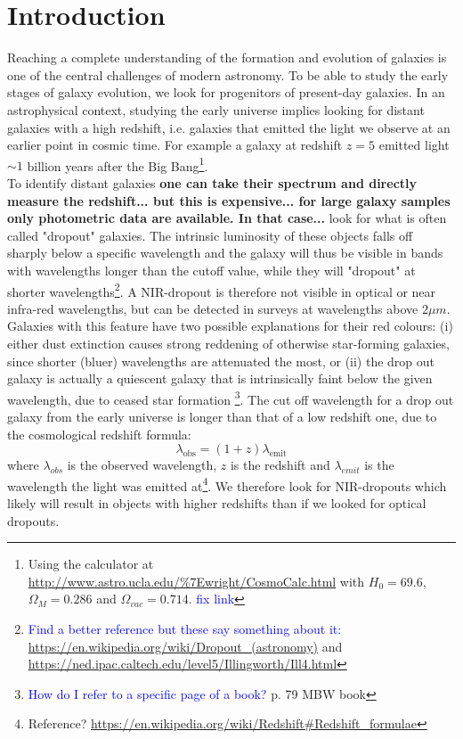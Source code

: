 \section{Introduction}
Reaching a complete understanding of the formation and evolution of galaxies is one of the central challenges of modern astronomy. To be able to study the early stages of galaxy evolution, we look for progenitors of present-day galaxies. In an astrophysical context, studying the early universe implies looking for distant galaxies with a high redshift, i.e. galaxies that emitted the light we observe at an earlier point in cosmic time. For example a galaxy at redshift $z=5$ emitted light $\sim1$ billion years after the Big Bang\footnote{Using the calculator at \url{http://www.astro.ucla.edu/\%7Ewright/CosmoCalc.html} with $H_0=69.6$, $\Omega_M=0.286$ and $\Omega_{vac}=0.714$. \textcolor{blue}{fix link}}. \\

To identify distant galaxies \textbf{ one can take their spectrum and directly measure the redshift... but this is expensive... for large galaxy samples only photometric data are available. In that case...} look for what is often called "dropout" galaxies. The intrinsic luminosity of these objects falls off sharply below a specific wavelength and the galaxy will thus be visible in bands with wavelengths longer than the cutoff value, while they will "dropout" at shorter wavelengths\footnote{ \textcolor{blue}{Find a better reference but these say something about it:} \url{https://en.wikipedia.org/wiki/Dropout_(astronomy)} and \url{https://ned.ipac.caltech.edu/level5/Illingworth/Ill4.html}}.
A NIR-dropout is therefore not visible in optical or near infra-red wavelengths, but can be detected in surveys at wavelengths above $2 \si{\mu m}$. Galaxies with this feature have two possible explanations for their red colours: (i) either dust extinction causes strong reddening of otherwise star-forming galaxies, since shorter (bluer) wavelengths are attenuated the most, or (ii) the drop out galaxy is actually a quiescent galaxy that is intrinsically faint below the given wavelength, due to ceased star formation \footnote{\textcolor{blue}{How do I refer to a specific page of a book?} p. 79 MBW book }. The cut off wavelength for a drop out galaxy from the early universe is longer than that of a low redshift one, due to the cosmological redshift formula:
\begin{equation}
    \lambda_\mathrm{obs} = (1+z)  \lambda_\mathrm{emit}
\end{equation}
where $\lambda_{obs}$ is the observed wavelength, $z$ is the redshift and $\lambda_{emit}$ is the wavelength the light was emitted at\footnote{Reference? \url{https://en.wikipedia.org/wiki/Redshift#Redshift_formulae} }. We therefore look for NIR-dropouts which likely will result in objects with higher redshifts than if we looked for optical dropouts.\\

